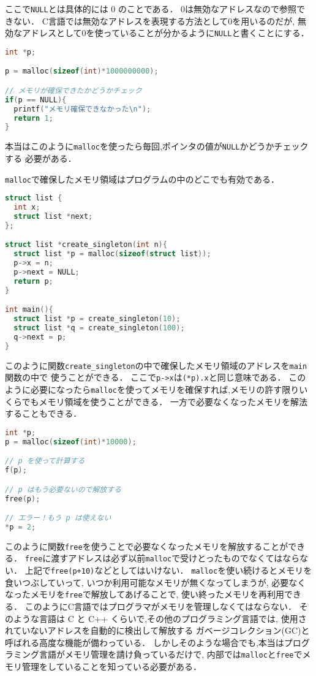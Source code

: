 \documentclass[a4paper,twoside,onecolumn,openany,article]{memoir}
\theoremstyle{remark}
\begin{document}
ここで\texttt{NULL}とは具体的には 0 のことである．
0は無効なアドレスなので参照できない．
C言語では無効なアドレスを表現する方法として0を用いるのだが,
無効なアドレスとして0を使っていることが分かるように\texttt{NULL}と書くことにする．
\begin{lstlisting}[basicstyle=\ttfamily\small,showstringspaces=false,language=C,frame=single]
int *p;

p = malloc(sizeof(int)*1000000000);

// メモリが確保できたかどうかチェック
if(p == NULL){
  printf("メモリ確保できなかった\n");
  return 1;
}

\end{lstlisting}
本当はこのように\texttt{malloc}を使ったら毎回,ポインタの値が\texttt{NULL}かどうかチェックする
必要がある．

\texttt{malloc}で確保したメモリ領域はプログラムの中のどこでも有効である．

\begin{lstlisting}[basicstyle=\ttfamily\small,showstringspaces=false,language=C,frame=single]
struct list {
  int x;
  struct list *next;
};

struct list *create_singleton(int n){
  struct list *p = malloc(sizeof(struct list));
  p->x = n;
  p->next = NULL;
  return p;
}

int main(){
  struct list *p = create_singleton(10);
  struct list *q = create_singleton(100);
  q->next = p;
}
\end{lstlisting}
このように関数\texttt{create\_singleton}の中で確保したメモリ領域のアドレスを\texttt{main}関数の中で
使うことができる．
ここで\texttt{p->x}は\texttt{(*p).x}と同じ意味である．
このように必要になったら\texttt{malloc}を使ってメモリを確保すれば,メモリの許す限りいくらでもメモリ領域を使うことができる．
一方で必要なくなったメモリを解法することもできる．

\begin{lstlisting}[basicstyle=\ttfamily\small,showstringspaces=false,language=C,frame=single]
int *p;
p = malloc(sizeof(int)*10000);

// p を使って計算する
f(p);

// p はもう必要ないので解放する
free(p);

// エラー！もう p は使えない
*p = 2;
\end{lstlisting}
このように関数\texttt{free}を使うことで必要なくなったメモリを解放することができる．
\texttt{free}に渡すアドレスは必ず以前\texttt{malloc}で受けとったものでなくてはならない．
上記で\texttt{free(p+10)}などとしてはいけない．
\texttt{malloc}を使い続けるとメモリを食いつぶしていって, いつか利用可能なメモリが無くなってしまうが,
必要なくなったメモリを\texttt{free}で解放してあげることで, 使い終ったメモリを再利用できる．
このようにC言語ではプログラマがメモリを管理しなくてはならない．
そのような言語は C と C++ くらいで,その他のプログラミング言語では, 使用されていないアドレスを自動的に検出して解放する
ガベージコレクション(GC)と呼ばれる高度な機能が備わっている．
しかしそのような場合でも,本当はプログラミング言語がメモリ管理を請け負っているだけで,
内部では\texttt{malloc}と\texttt{free}でメモリ管理をしていることを知っている必要がある．
\end{document}
